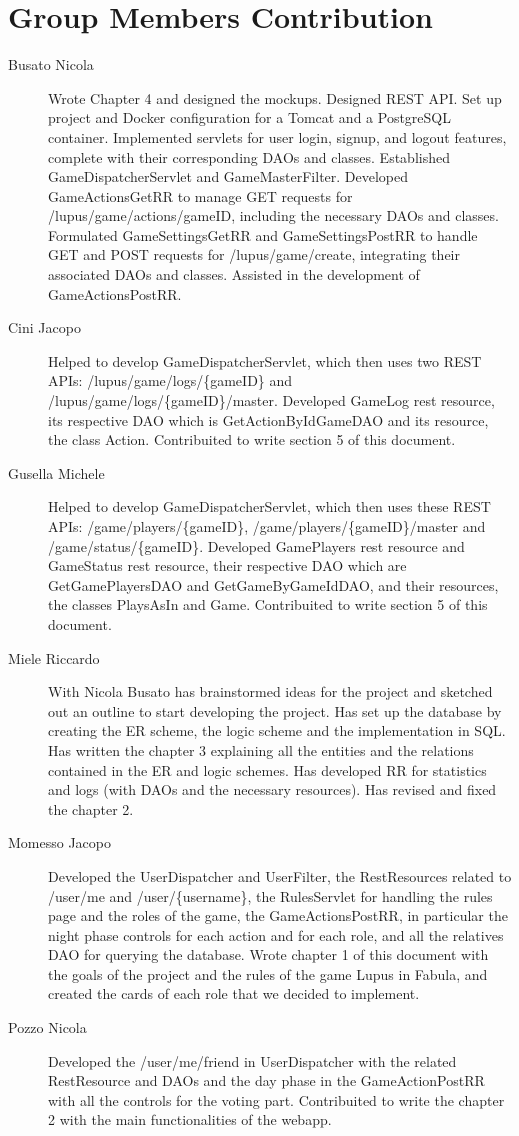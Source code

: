 \section{Group Members Contribution}


\begin{description}
	\item[Busato Nicola] Wrote Chapter 4 and designed the mockups. Designed REST API. Set up project and Docker configuration for a Tomcat and a PostgreSQL container. Implemented servlets for user login, signup, and logout features, complete with their corresponding DAOs and classes.
    Established GameDispatcherServlet and GameMasterFilter.
    Developed GameActionsGetRR to manage GET requests for /lupus/game/actions/{gameID}, including the necessary DAOs and classes.
    Formulated GameSettingsGetRR and GameSettingsPostRR to handle GET and POST requests for /lupus/game/create, integrating their associated DAOs and classes.
    Assisted in the development of GameActionsPostRR.
    \item[Cini Jacopo]
    Helped to develop GameDispatcherServlet, which then uses two REST APIs: /lupus/game/logs/\{gameID\} and /lupus/game/logs/\{gameID\}/master. Developed GameLog rest resource, its respective DAO which is GetActionByIdGameDAO and its resource, the class Action. Contribuited to write section 5 of this document.
    \item[Gusella Michele] Helped to develop GameDispatcherServlet, which then uses these REST APIs: /game/players/\{gameID\}, /game/players/\{gameID\}/master and /game/status/\{gameID\}. Developed GamePlayers rest resource and GameStatus rest resource, their respective DAO which are GetGamePlayersDAO and GetGameByGameIdDAO, and their resources, the classes PlaysAsIn and Game. Contribuited to write section 5 of this document.
    \item[Miele Riccardo] With Nicola Busato has brainstormed ideas for the project and sketched out an outline to start developing the project. Has set up the database by creating the ER scheme, the logic scheme and the implementation in SQL. Has written the chapter 3 explaining all the entities and the relations contained in the ER and logic schemes.
    Has developed RR for statistics and logs (with DAOs and the necessary resources). Has revised and fixed the chapter 2.
	\item[Momesso Jacopo] Developed the UserDispatcher and UserFilter, the RestResources related to /user/me and /user/\{username\}, the RulesServlet for handling the rules page and the roles of the game, the GameActionsPostRR, in particular the night phase controls for each action and for each role, and all the relatives DAO for querying the database. Wrote chapter 1 of this document with the goals of the project and the rules of the game Lupus in Fabula, and created the cards of each role that we decided to implement.
    \item[Pozzo Nicola] Developed the /user/me/friend in UserDispatcher with the related RestResource and DAOs and the day phase in the GameActionPostRR with all the controls for the voting part. Contribuited to write the chapter 2 with the main functionalities of the webapp. 
\end{description}

